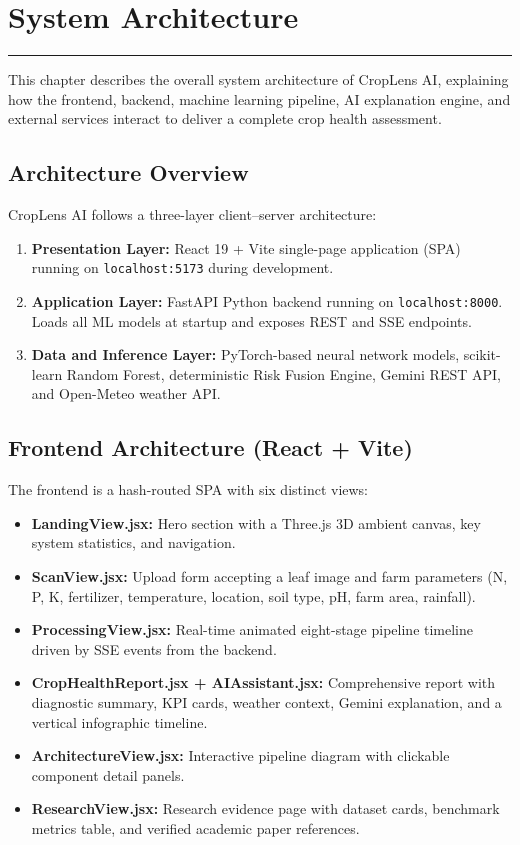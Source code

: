 \chapter{System Architecture}
\noindent\rule{\linewidth}{2pt}
This chapter describes the overall system architecture of CropLens AI, explaining how the frontend, backend, machine learning pipeline, AI explanation engine, and external services interact to deliver a complete crop health assessment.

\section{Architecture Overview}

CropLens AI follows a three-layer client--server architecture:
\begin{enumerate}
    \item \textbf{Presentation Layer:} React 19 + Vite single-page application (SPA) running on \texttt{localhost:5173} during development.
    \item \textbf{Application Layer:} FastAPI Python backend running on \texttt{localhost:8000}. Loads all ML models at startup and exposes REST and SSE endpoints.
    \item \textbf{Data and Inference Layer:} PyTorch-based neural network models, scikit-learn Random Forest, deterministic Risk Fusion Engine, Gemini REST API, and Open-Meteo weather API.
\end{enumerate}

\section{Frontend Architecture (React + Vite)}

The frontend is a hash-routed SPA with six distinct views:
\begin{itemize}
    \item \textbf{LandingView.jsx:} Hero section with a Three.js 3D ambient canvas, key system statistics, and navigation.
    \item \textbf{ScanView.jsx:} Upload form accepting a leaf image and farm parameters (N, P, K, fertilizer, temperature, location, soil type, pH, farm area, rainfall).
    \item \textbf{ProcessingView.jsx:} Real-time animated eight-stage pipeline timeline driven by SSE events from the backend.
    \item \textbf{CropHealthReport.jsx + AIAssistant.jsx:} Comprehensive report with diagnostic summary, KPI cards, weather context, Gemini explanation, and a vertical infographic timeline.
    \item \textbf{ArchitectureView.jsx:} Interactive pipeline diagram with clickable component detail panels.
    \item \textbf{ResearchView.jsx:} Research evidence page with dataset cards, benchmark metrics table, and verified academic paper references.
\end{itemize}

